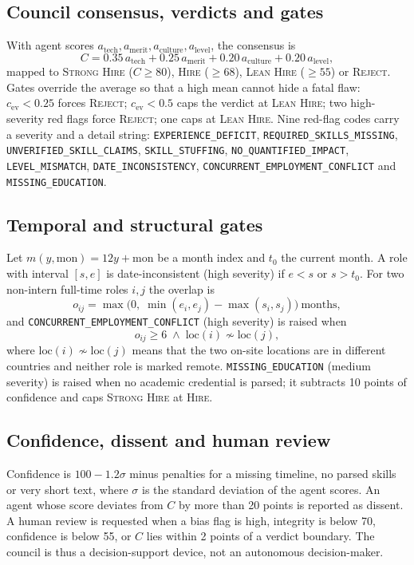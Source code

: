 \documentclass[conference]{IEEEtran}
\newcommand{\verd}[1]{\textsc{#1}}
\newcommand{\flag}[1]{\texttt{\footnotesize #1}}
\newcommand{\Sstrong}{\verd{Strong Hire}}
\newcommand{\Shire}{\verd{Hire}}
\newcommand{\Slean}{\verd{Lean Hire}}
\newcommand{\Sreject}{\verd{Reject}}
\begin{document}
\subsection{Council consensus, verdicts and gates}
With agent scores $a_{\mathrm{tech}}, a_{\mathrm{merit}}, a_{\mathrm{culture}}, a_{\mathrm{level}}$, the consensus is
\begin{equation}
C = 0.35\,a_{\mathrm{tech}} + 0.25\,a_{\mathrm{merit}} + 0.20\,a_{\mathrm{culture}} + 0.20\,a_{\mathrm{level}},
\label{eq:consensus}
\end{equation}
mapped to \Sstrong{} ($C\ge80$), \Shire{} ($\ge68$), \Slean{} ($\ge55$) or \Sreject{}. Gates override the average so that a high mean cannot hide a fatal flaw: $c_{\mathrm{ev}}<0.25$ forces \Sreject{}; $c_{\mathrm{ev}}<0.5$ caps the verdict at \Slean{}; two high-severity red flags force \Sreject{}; one caps at \Slean{}. Nine red-flag codes carry a severity and a detail string: \flag{EXPERIENCE\_DEFICIT}, \flag{REQUIRED\_SKILLS\_MISSING}, \flag{UNVERIFIED\_SKILL\_CLAIMS}, \flag{SKILL\_STUFFING}, \flag{NO\_QUANTIFIED\_IMPACT}, \flag{LEVEL\_MISMATCH}, \flag{DATE\_INCONSISTENCY}, \flag{CONCURRENT\_EMPLOYMENT\_CONFLICT} and \flag{MISSING\_EDUCATION}.

\subsection{Temporal and structural gates}
\label{sec:gates}
Let $m(y,\mathrm{mon})=12y+\mathrm{mon}$ be a month index and $t_0$ the current month. A role with interval $[s,e]$ is date-inconsistent (high severity) if $e<s$ or $s>t_0$. For two non-intern full-time roles $i,j$ the overlap is
\begin{equation}
o_{ij}=\max\bigl(0,\;\min(e_i,e_j)-\max(s_i,s_j)\bigr)\ \text{months},
\end{equation}
and \flag{CONCURRENT\_EMPLOYMENT\_CONFLICT} (high severity) is raised when
\begin{equation}
o_{ij}\ge 6\;\wedge\;\mathrm{loc}(i)\not\sim \mathrm{loc}(j),
\label{eq:concurrent}
\end{equation}
where $\mathrm{loc}(i)\not\sim\mathrm{loc}(j)$ means that the two on-site locations are in different countries and neither role is marked remote. \flag{MISSING\_EDUCATION} (medium severity) is raised when no academic credential is parsed; it subtracts 10 points of confidence and caps \Sstrong{} at \Shire{}.

\subsection{Confidence, dissent and human review}
Confidence is $100-1.2\sigma$ minus penalties for a missing timeline, no parsed skills or very short text, where $\sigma$ is the standard deviation of the agent scores. An agent whose score deviates from $C$ by more than 20 points is reported as dissent. A human review is requested when a bias flag is high, integrity is below 70, confidence is below 55, or $C$ lies within 2 points of a verdict boundary. The council is thus a decision-support device, not an autonomous decision-maker.
\end{document}
